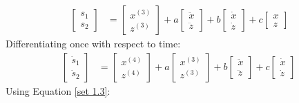 \documentclass{article}
\begin{document}
\begin{align}
\left[\begin{array}{cc}s_1\\s_2\end{array}\right] &= \left[\begin{array}{cc}x^{(3)}\\z^{(3)}\end{array}\right] + a\left[\begin{array}{cc}\ddot{x}\\\ddot{z}\end{array}\right] + b\left[\begin{array}{cc}\dot{x}\\\dot{z}\end{array}\right] + c\left[\begin{array}{cc}{x}\\{z}\end{array}\right]  
 \label{set 1.4}
\end{align}
Differentiating once with respect to time:
\begin{align*}
\left[\begin{array}{cc}\dot{s}_1\\\dot{s}_2\end{array}\right] &= \left[\begin{array}{cc}x^{(4)}\\z^{(4)}\end{array}\right] + a\left[\begin{array}{cc}x^{(3)}\\z^{(3)}\end{array}\right] + b\left[\begin{array}{cc}\ddot{x}\\\ddot{z}\end{array}\right] + c\left[\begin{array}{cc}\dot{x}\\\dot{z}\end{array}\right]  
\ 
\end{align*}
Using Equation \ref{set 1.3}:
\end{document}
